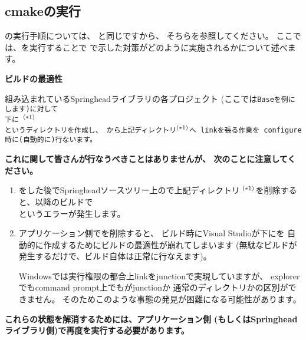\subsection{cmakeの実行}
\label{subsec:CmakeApplication}

\noindent
\cmake の実行手順については、
と同じですから、
そちらを参照してください。
ここでは、\cmake を実行することで
で示した対策がどのように実施されるかについて述べます。

\bigskip
\noindent
\bf{ビルドの最適性}
\begin{narrow}[20pt]
	組み込まれているSpringheadライブラリの各プロジェクト
	(ここでは\tt{Base}を例にします)に対して\\
	\hspace{20pt}下に
	$^{\small (*1)}$\\
	というディレクトリを作成し、
	から上記ディレクトリ$^{\small (*1)}$へ
	linkを張る作業を\cmake\ configure時に(自動的に)行ないます。
\end{narrow}	
\begin{narrow}[20pt]
	\thinrule{\linewidth}
	{\bf{これに関して皆さんが行なうべきことはありませんが、
	次のことに注意してください。}}

	\medskip
	\begin{enumerate}
	  \item	\cmake をした後でSpringheadソースツリー上ので上記ディレクトリ
		$^{\small (*1)}$を削除すると、以降のビルドで\\
		というエラーが発生します。

	  \item	アプリケーション側でを削除すると、
		ビルド時にVisual Studioが\build 下にを
		自動的に作成するためにビルドの最適性が崩れてしまいます
		(無駄なビルドが発生するだけで、ビルド自体は正常に行なえます)。
		\begin{narrow}[s][15pt]
		Windowsでは実行権限の都合上linkをjunctionで実現していますが、
		explorerでもcommand prompt上でもがjunctionか
		通常のディレクトリかの区別ができません。
		そのためこのような事態の発見が困難になる可能性があります。
		\end{narrow}
	\end{enumerate}
	\medskip
	{\bf{これらの状態を解消するためには、アプリケーション側
	(もしくはSpringheadライブラリ側)で再度\cmake を実行する必要があります。}}

	\thinrule{\linewidth}
\end{narrow}

